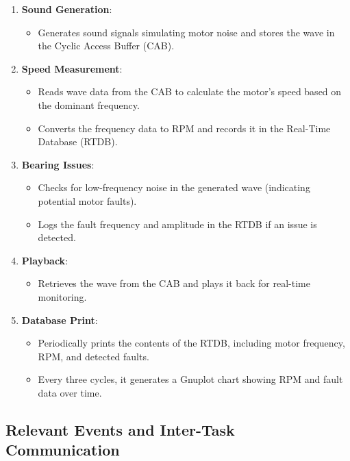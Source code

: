 \documentclass[a4paper,12pt]{article}
\begin{document}
\begin{enumerate}
    \item \textbf{Sound Generation}:
    \begin{itemize}
        \item Generates sound signals simulating motor noise and stores the wave in the Cyclic Access Buffer (CAB).
    \end{itemize}

    \item \textbf{Speed Measurement}:
    \begin{itemize}
        \item Reads wave data from the CAB to calculate the motor's speed based on the dominant frequency.
        \item Converts the frequency data to RPM and records it in the Real-Time Database (RTDB).
    \end{itemize}
    
    \item \textbf{Bearing Issues}:
    \begin{itemize}
        \item Checks for low-frequency noise in the generated wave (indicating potential motor faults).
        \item Logs the fault frequency and amplitude in the RTDB if an issue is detected.
    \end{itemize}

    \item \textbf{Playback}:
    \begin{itemize}
        \item Retrieves the wave from the CAB and plays it back for real-time monitoring.
    \end{itemize}

    \item \textbf{Database Print}:
    \begin{itemize}
        \item Periodically prints the contents of the RTDB, including motor frequency, RPM, and detected faults.
        \item Every three cycles, it generates a Gnuplot chart showing RPM and fault data over time.
    \end{itemize}
\end{enumerate}

\subsection{Relevant Events and Inter-Task Communication}
\end{document}
